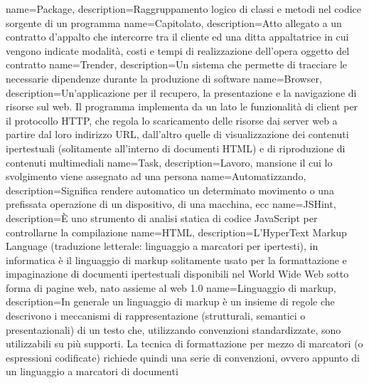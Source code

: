  {
	name=Package,
	description={Raggruppamento logico di classi e metodi nel codice sorgente di un programma}
}
 {
	name=Capitolato,
	description={Atto allegato a un contratto d'appalto che intercorre tra il cliente ed una ditta appaltatrice in cui vengono indicate modalità, costi e tempi di realizzazione dell'opera oggetto del contratto}
}
 {
	name=Trender,
	description={Un sistema che permette di tracciare le necessarie dipendenze durante la produzione di software}
}
 {
	name=Browser,
	description={Un'applicazione per il recupero, la presentazione e la navigazione di risorse sul web. Il programma implementa da un lato le funzionalità di client per il protocollo HTTP, che regola lo scaricamento delle risorse dai server web a partire dal loro indirizzo URL, dall'altro quelle di visualizzazione dei contenuti ipertestuali (solitamente all'interno di documenti HTML) e di riproduzione di contenuti multimediali}
}
 {
	name=Task,
	description={Lavoro, mansione il cui lo svolgimento viene assegnato ad una persona}
}
 {
	name=Automatizzando,
	description={Significa rendere automatico un determinato movimento o una prefissata operazione di un dispositivo, di una macchina, ecc}
}
 {
	name=JSHint,
	description={È uno strumento di analisi statica di codice JavaScript per controllarne la compilazione}
}
 {
	name=HTML,
	description={L'HyperText Markup Language (traduzione letterale: linguaggio a marcatori per ipertesti), in informatica è il linguaggio di markup solitamente usato per la formattazione e impaginazione di documenti ipertestuali disponibili nel World Wide Web sotto forma di pagine web, nato assieme al web 1.0}
}
 {
	name=Linguaggio di markup,
	description={In generale un linguaggio di markup è un insieme di regole che descrivono i meccanismi di rappresentazione (strutturali, semantici o presentazionali) di un testo che, utilizzando convenzioni standardizzate, sono utilizzabili su più supporti. La tecnica di formattazione per mezzo di marcatori (o espressioni codificate) richiede quindi una serie di convenzioni, ovvero appunto di un linguaggio a marcatori di documenti}
}
